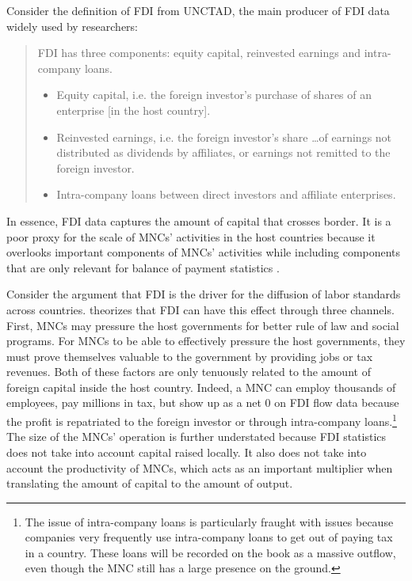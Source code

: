 Consider the definition of FDI from UNCTAD, the main producer of FDI data widely
used by researchers:

\begin{quote} FDI has three components: equity capital, reinvested earnings and
intra-company loans.
\begin{itemize}
\item Equity capital, i.e. the foreign investor’s purchase of shares of an
enterprise [in the host country].
\item Reinvested earnings, i.e. the foreign investor’s share \ldots of earnings
not distributed as dividends by affiliates, or earnings not remitted to the
foreign investor.
  \item Intra-company loans between direct investors and affiliate enterprises.
\end{itemize} \citep[245]{UNCTAD2007}
\end{quote}

In essence, FDI data captures the amount of capital that crosses border. It is a
poor proxy for the scale of MNCs' activities in the host countries because it
overlooks important components of MNCs' activities while including components
that are only relevant for balance of payment statistics
\citep{Beugelsdijk2010}.

Consider the argument that FDI is the driver for the diffusion of labor
standards across countries. \citet{Mosley2007} theorizes that FDI can have this
effect through three channels. First, MNCs may pressure the host governments for
better rule of law and social programs. For MNCs to be able to effectively
pressure the host governments, they must prove themselves valuable to the
government by providing jobs or tax revenues. Both of these factors are only
tenuously related to the amount of foreign capital inside the host country.
Indeed, a MNC can employ thousands of employees, pay millions in tax, but show
up as a net 0 on FDI flow data because the profit is repatriated to the foreign
investor or through intra-company loans.\footnote{The issue of intra-company
loans is particularly fraught with issues because companies very frequently use
intra-company loans to get out of paying tax in a country. These loans will be
recorded on the book as a massive outflow, even though the MNC still has a large
presence on the ground.} The size of the MNCs' operation is further understated
because FDI statistics does not take into account capital raised locally. It
also does not take into account the productivity of MNCs, which acts as an
important multiplier when translating the amount of capital to the amount of
output.

